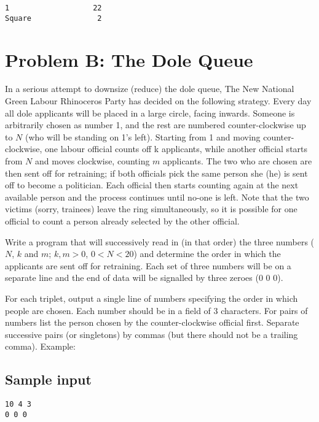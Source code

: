 \begin{verbatim}
1                   22
Square               2
\end{verbatim}

\newpage

\section*{Problem B: The Dole Queue}

In a serious attempt to downsize (reduce) the dole queue, The New
National Green Labour Rhinoceros Party has decided on the following
strategy.  Every day all dole applicants will be placed in a large
circle, facing inwards.  Someone is arbitrarily chosen as number 1,
and the rest are numbered counter-clockwise up to $N$ (who will be
standing on 1's left).  Starting from 1 and moving counter-clockwise,
one labour official counts off k applicants, while another official
starts from $N$ and moves clockwise, counting $m$ applicants.  The two who
are chosen are then sent off for retraining; if both officials pick
the same person she (he) is sent off to become a politician.  Each
official then starts counting again at the next available person and
the process continues until no-one is left.  Note that the two victims
(sorry, trainees) leave the ring simultaneously, so it is possible for
one official to count a person already selected by the other official.

Write a program that will successively read in (in that order) the
three numbers ($N$, $k$ and $m$; $k, m > 0$, $0 < N < 20$) and determine
the order in which the applicants are sent off for retraining.  Each
set of three numbers will be on a separate line and the end of data
will be signalled by three zeroes (0 0 0).

For each triplet, output a single line of numbers specifying the order
in which people are chosen.  Each number should be in a field of 3
characters.  For pairs of numbers list the person chosen by the
counter-clockwise official first.  Separate successive pairs (or
singletons) by commas (but there should not be a trailing comma).
Example:

\subsection*{Sample input}

\begin{verbatim}
10 4 3
0 0 0
\end{verbatim}

